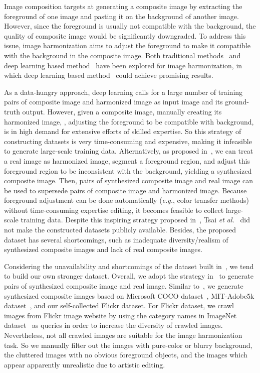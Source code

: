 \documentclass[10pt,twocolumn,letterpaper]{article}
\begin{document}
Image composition targets at generating a composite image by extracting the foreground of one image and pasting it on the background of another image. However, since the foreground is usually not compatible with the background, the quality of composite image would be significantly downgraded. To address this issue, image harmonization aims to adjust the foreground to make it compatible with the background in the composite image. Both traditional methods~\cite{lalonde2007using,xue2012understanding,zhu2015learning} and deep learning based method~\cite{tsai2017deep,xiaodong2019improving} have been explored for image harmonization, in which deep learning based method~\cite{tsai2017deep,xiaodong2019improving} could achieve promising results.

As a data-hungry approach, deep learning calls for a large number of training pairs of composite image and harmonized image as input image and its ground-truth output. However, given a composite image, manually creating its harmonized image, \ie, adjusting the foreground to be compatible with background, is in high demand for extensive efforts of skilled expertise. So this strategy of constructing datasets is very time-consuming and expensive, making it infeasible to generate large-scale training data. Alternatively, as proposed in~\cite{tsai2017deep}, we can treat a real image as harmonized image, segment a foreground region, and adjust this foreground region to be inconsistent with the background, yielding a synthesized composite image. Then, pairs of synthesized composite image and real image can be used to supersede pairs of composite image and harmonized image. Because foreground adjustment can be done automatically (\emph{e.g.}, color transfer methods) without time-consuming expertise editing, it becomes feasible to collect large-scale training data. Despite this inspiring strategy proposed in~\cite{tsai2017deep}, Tsai \emph{et al.}~\cite{tsai2017deep} did not make the constructed datasets publicly available. Besides, the proposed dataset has several shortcomings, such as inadequate diversity/realism of synthesized composite images and lack of real composite images.

Considering the unavailability and shortcomings of the dataset built in~\cite{tsai2017deep}, we tend to build our own stronger dataset. Overall, we adopt the strategy in~\cite{tsai2017deep} to generate pairs of synthesized composite image and real image. Similar to~\cite{tsai2017deep}, we generate synthesized composite images based on Microsoft COCO dataset~\cite{lin2014microsoft}, MIT-Adobe5k dataset~\cite{bychkovsky2011learning}, and our self-collected Flickr dataset. For Flickr dataset, we crawl images from Flickr image website by using the category names in ImageNet dataset~\cite{imagenet_cvpr09} as queries in order to increase the diversity of crawled images. Nevertheless, not all crawled images are suitable for the image harmonization task. So we manually filter out the images with pure-color or blurry background, the cluttered images with no obvious foreground objects, and the images which appear apparently unrealistic due to artistic editing.
\end{document}
